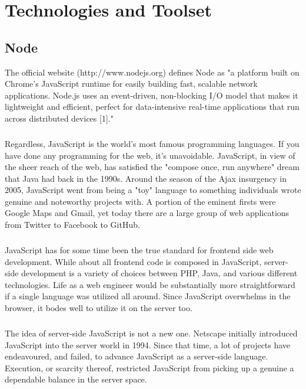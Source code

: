 \documentclass[thesis.tex]{subfiles}
\begin{document}
\chapter{Technologies and Toolset}

\section{Node}
The official website (http://www.nodejs.org) defines Node as "a platform built on Chrome's JavaScript runtime for easily building fast, scalable network applications. Node.js uses an event-driven, non-blocking I/O model that makes it lightweight and efficient, perfect for data-intensive real-time applications that run across distributed devices [1]."
\paragraph{}
Regardless, JavaScript is the world's most famous programming languages. If you have done any programming for the web, it's unavoidable. JavaScript, in view of the sheer reach of the web, has satisfied the "compose once, run anywhere" dream that Java had back in the 1990s.  
Around the season of the Ajax insurgency in 2005, JavaScript went from being a "toy" language to something individuals wrote genuine and noteworthy projects with. A portion of the eminent firsts were Google Maps and Gmail, yet today there are a large group of web applications from Twitter to Facebook to GitHub.
\paragraph{}

JavaScript has for some time been the true standard for frontend side web development. While about all frontend code is composed in JavaScript, server-side development is a variety of choices between PHP, Java, and various different technologies. Life as a web engineer would be substantially more straightforward if a single language was utilized all around. Since JavaScript overwhelms in the browser, it bodes well to utilize it on the server too. 
\paragraph{}

The idea of server-side JavaScript is not a new one. Netscape initially introduced JavaScript into the server world in 1994. Since that time, a lot of projects have endeavoured, and failed, to advance JavaScript as a server-side language. Execution, or scarcity thereof, restricted JavaScript from picking up a genuine a dependable balance in the server space. 
\end{document}
